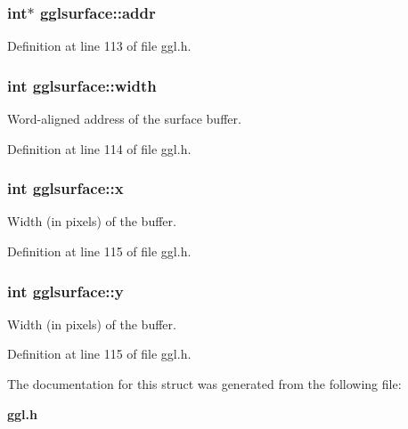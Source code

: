 \subsubsection{\setlength{\rightskip}{0pt plus 5cm}int$\ast$ {\bf gglsurface::addr}}\label{structgglsurface_o0}




Definition at line 113 of file ggl.h.
\subsubsection{\setlength{\rightskip}{0pt plus 5cm}int {\bf gglsurface::width}}\label{structgglsurface_o1}


Word-aligned address of the surface buffer. 



Definition at line 114 of file ggl.h.
\subsubsection{\setlength{\rightskip}{0pt plus 5cm}int {\bf gglsurface::x}}\label{structgglsurface_o2}


Width (in pixels) of the buffer. 



Definition at line 115 of file ggl.h.
\subsubsection{\setlength{\rightskip}{0pt plus 5cm}int {\bf gglsurface::y}}\label{structgglsurface_o3}


Width (in pixels) of the buffer. 



Definition at line 115 of file ggl.h.

The documentation for this struct was generated from the following file:\begin{CompactItemize}
\item 
{\bf ggl.h}\end{CompactItemize}
